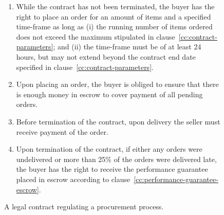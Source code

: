 \documentclass{article}
\newcommand{\placeholder}[1]{\mbox{$\langle$\textit{#1}$\rangle$}}
\begin{document}
\begin{figure}[t]
{\begin{enumerate}
     \item \label{cc:right-to-order} While the contract has not been terminated, the buyer has the right to place an order for an amount of items and a specified time-frame as long as (i) the running number of items ordered does not exceed the maximum stipulated in clause~\ref{cc:contract-parameters}; and (ii) the time-frame must be of at least 24 hours, but may not extend beyond the contract end date specified in clause~\ref{cc:contract-parameters}. 
     \item \label{cc:escrow-payment-for-order} Upon placing an order, the buyer is obliged to ensure that there is enough money in escrow to cover payment of all pending orders.
     \item Before termination of the contract, upon delivery the seller must receive payment of the order.
     \item Upon termination of the contract, if either any orders were undelivered or more than 25\% of the orders were delivered late, the buyer has the right to receive the performance guarantee placed in escrow according to clause~\ref{cc:performance-guarantee-escrow}. %
    \end{enumerate}
    }\normalsize
    \vspace{-2ex}
    \caption{A legal contract regulating a procurement process.}
    \label{f:legal-contract-procurement}
    \end{figure}
    
\end{document}
